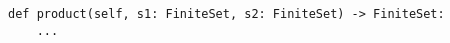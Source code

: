 \begin{verbatim}
def product(self, s1: FiniteSet, s2: FiniteSet) -> FiniteSet:
    ...
\end{verbatim}